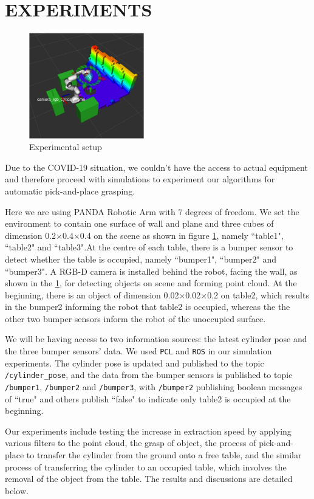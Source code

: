 \section{EXPERIMENTS}\label{sec:exp}
\begin{figure}[h]
    \centering
    \includegraphics[width=5cm]{figures/exp2.png}
    \caption{Experimental setup}
    \label{fig:exp_setup}
\end{figure}
Due to the COVID-19 situation, we couldn't have the access to actual equipment and therefore proceed with simulations to experiment our algorithms for automatic pick-and-place grasping. 

Here we are using PANDA Robotic Arm with 7 degrees of freedom. We set the environment to contain one surface of wall and plane and three cubes of dimension 0.2$\times$0.4$\times$0.4 on the scene as shown in figure \ref{fig:exp_setup}, namely ``table1", ``table2" and ``table3".At the centre of each table, there is a bumper sensor to detect whether the table is occupied, namely ``bumper1", ``bumper2" and ``bumper3". A RGB-D camera is installed behind the robot, facing the wall, as shown in the \ref{fig:exp_setup}, for detecting objects on scene and forming point cloud. At the beginning, there is an object of dimension 0.02$\times$0.02$\times$0.2 on table2, which results in the bumper2 informing the robot that table2 is occupied, whereas the the other two bumper sensors inform the robot of the unoccupied surface. 

We will be having access to two information sources: the latest cylinder pose and the three bumper sensors' data. We used \texttt{PCL} and \texttt{ROS} in our simulation experiments. The cylinder pose is updated and published to the  topic \texttt{/cylinder\_pose}, and the data from the bumper sensors is published to  topic \texttt{/bumper1}, \texttt{/bumper2} and \texttt{/bumper3}, with \texttt{/bumper2} publishing boolean messages of ``true" and others publish ``false" to indicate only table2 is occupied at the beginning. 

Our experiments include testing the increase in extraction speed by applying various filters to the point cloud, the grasp of object, the process of pick-and-place to transfer the cylinder from the ground onto a free table, and the similar process of transferring the cylinder to an occupied table, which involves the removal of the object from the table. The results and discussions are detailed below.

